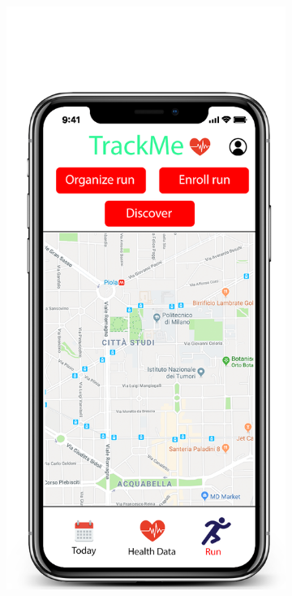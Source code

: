 \documentclass[12pt]{article}
\begin{document}
\begin{figure}[H]
\centering
    \begin{subfigure}{.4\textwidth}
        \includegraphics[scale=0.2]{HomeScreen3.png}
        \label{fig:HomeScreen1}

\end{subfigure}
\end{figure}
\end{document}
